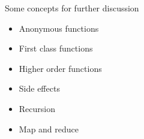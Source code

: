 \begin{frame}{Some concepts for further discussion}
  \begin{itemize}
    \item Anonymous functions
    \item First class functions
    \item Higher order functions
    \item Side effects
    \item Recursion
    \item Map and reduce
  \end{itemize}
\end{frame}









